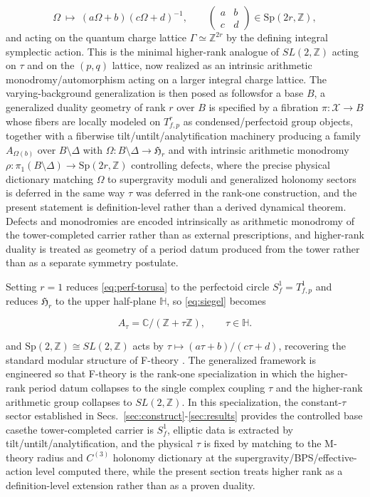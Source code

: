 \documentclass[11pt]{article}
\theoremstyle{remark}
\newcommand{\Z}{\mathbb{Z}}
\begin{document}
\begin{equation}\label{eq:Sp-action}
\Omega\ \longmapsto\ (a\Omega+b)(c\Omega+d)^{-1},
\qquad
\begin{pmatrix}a&b\\ c&d\end{pmatrix}\in \mathrm{Sp}(2r,\Z),
\end{equation}
and acting on the quantum charge lattice \(\Gamma\simeq \Z^{2r}\) by the defining integral symplectic action. This is the minimal higher-rank analogue of \(SL(2,\Z)\) acting on \(\tau\) and on the \((p,q)\) lattice, now realized as an intrinsic arithmetic monodromy/automorphism acting on a larger integral charge lattice. The varying-background generalization is then posed as follows\:for a base \(B\), a generalized duality geometry of rank \(r\) over \(B\) is specified by a fibration \(\pi:\mathcal{X}\to B\) whose fibers are locally modeled on \(T^{r}_{f,p}\) as condensed/perfectoid group objects, together with a fiberwise tilt/untilt/analytification machinery producing a family \(A_{\Omega(b)}\) over \(B\setminus\Delta\) with \(\Omega:B\setminus\Delta\to \mathfrak{H}_{r}\) and with intrinsic arithmetic monodromy \(\rho:\pi_{1}(B\setminus\Delta)\to \mathrm{Sp}(2r,\Z)\) controlling defects, where the precise physical dictionary matching \(\Omega\) to supergravity moduli and generalized holonomy sectors is deferred in the same way \(\tau\) was deferred in the rank-one construction, and the present statement is definition-level rather than a derived dynamical theorem. Defects and monodromies are encoded intrinsically as arithmetic monodromy of the tower-completed carrier rather than as external prescriptions, and higher-rank duality is treated as geometry of a period datum produced from the tower rather than as a separate symmetry postulate.

Setting \(r=1\) reduces \eqref{eq:perf-torusa} to the perfectoid circle
\(S^{1}_{f}=T^{1}_{f,p}\) and reduces \(\mathfrak{H}_{r}\) to the upper
half-plane \(\mathbb{H}\), so \eqref{eq:siegel} becomes

\begin{equation}\label{eq:r1}
A_{\tau} = \mathbb{C}/(\mathbb{Z} + \tau \mathbb{Z}),
\qquad
\tau \in \mathbb{H}.
\end{equation}

and \(\mathrm{Sp}(2,\Z)\cong SL(2,\Z)\) acts by \(\tau\mapsto (a\tau+b)/(c\tau+d)\), recovering the standard modular structure of F-theory \cite{Vafa1996}. The generalized framework is engineered so that F-theory is the rank-one specialization in which the higher-rank period datum collapses to the single complex coupling \(\tau\) and the higher-rank arithmetic group collapses to \(SL(2,\Z)\). In this specialization, the constant-\(\tau\) sector established in Secs.~\ref{sec:construct}-\ref{sec:results} provides the controlled base case\:the tower-completed carrier is \(S^{1}_{f}\), elliptic data is extracted by tilt/untilt/analytification, and the physical \(\tau\) is fixed by matching to the M-theory radius and \(C^{(3)}\) holonomy dictionary at the supergravity/BPS/effective-action level computed there, while the present section treats higher rank as a definition-level extension rather than as a proven duality.
\end{document}
